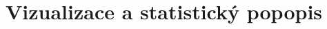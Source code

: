\documentclass[hyperref={unicode}, xcolor={table}]{beamer}
\begin{document}
    
    
\section{Vizualizace a statistický popopis}
\end{document}
